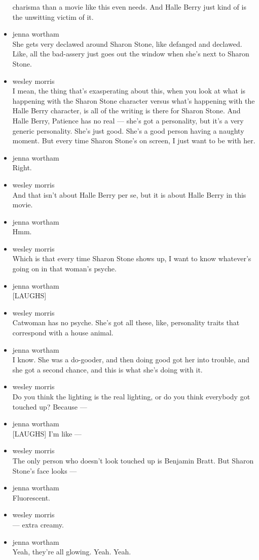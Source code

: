 \begin{itemize}
  charisma than a movie like this even needs. And Halle Berry just kind
  of is the unwitting victim of it.
\item
  jenna wortham\\
  She gets very declawed around Sharon Stone, like defanged and
  declawed. Like, all the bad-assery just goes out the window when she's
  next to Sharon Stone.
\item
  wesley morris\\
  I mean, the thing that's exasperating about this, when you look at
  what is happening with the Sharon Stone character versus what's
  happening with the Halle Berry character, is all of the writing is
  there for Sharon Stone. And Halle Berry, Patience has no real ---
  she's got a personality, but it's a very generic personality. She's
  just good. She's a good person having a naughty moment. But every time
  Sharon Stone's on screen, I just want to be with her.
\item
  jenna wortham\\
  Right.
\item
  wesley morris\\
  And that isn't about Halle Berry per se, but it is about Halle Berry
  in this movie.
\item
  jenna wortham\\
  Hmm.
\item
  wesley morris\\
  Which is that every time Sharon Stone shows up, I want to know
  whatever's going on in that woman's psyche.
\item
  jenna wortham\\
  {[}LAUGHS{]}
\item
  wesley morris\\
  Catwoman has no psyche. She's got all these, like, personality traits
  that correspond with a house animal.
\item
  jenna wortham\\
  I know. She was a do-gooder, and then doing good got her into trouble,
  and she got a second chance, and this is what she's doing with it.
\item
  wesley morris\\
  Do you think the lighting is the real lighting, or do you think
  everybody got touched up? Because ---
\item
  jenna wortham\\
  {[}LAUGHS{]} I'm like ---
\item
  wesley morris\\
  The only person who doesn't look touched up is Benjamin Bratt. But
  Sharon Stone's face looks ---
\item
  jenna wortham\\
  Fluorescent.
\item
  wesley morris\\
  --- extra creamy.
\item
  jenna wortham\\
  Yeah, they're all glowing. Yeah. Yeah.


\end{itemize}
